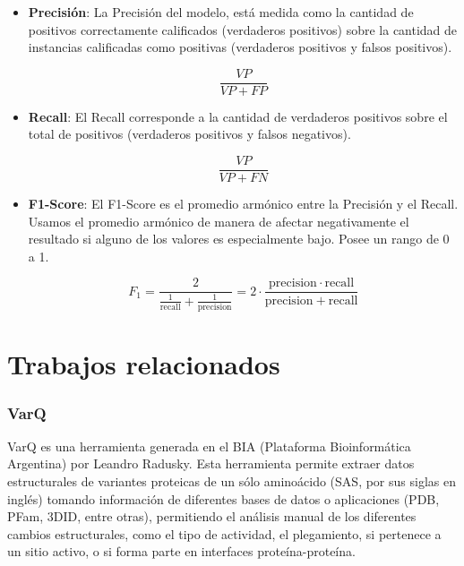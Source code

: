 \begin{itemize}
    \item \textbf{Precisión}: La Precisión del modelo, está medida como la cantidad de positivos correctamente calificados (verdaderos positivos) sobre la cantidad de instancias calificadas como positivas (verdaderos positivos y falsos positivos).
    
    \begin{equation*}
        \frac{VP}{VP + FP}
    \end{equation*}
    
    \item \textbf{Recall}: El Recall corresponde a la cantidad de verdaderos positivos sobre el total de positivos (verdaderos positivos y falsos negativos).
    
    \begin{equation*}
        \frac{VP}{VP + FN}
    \end{equation*}
    
    \item \textbf{F1-Score}: El F1-Score es el promedio armónico entre la Precisión y el Recall. Usamos el promedio armónico de manera de afectar negativamente el resultado si alguno de los valores es especialmente bajo. Posee un rango de 0 a 1. 
    
    \begin{equation*}
        F_1 = \frac{2}{\tfrac{1}{\mathrm{recall}} + \tfrac{1}{\mathrm{precision}}} = 2 \cdot \frac{\mathrm{precision} \cdot \mathrm{recall}}{\mathrm{precision} + \mathrm{recall}}
    \end{equation*}
    
\end{itemize}

\section{Trabajos relacionados}

\subsubsection{VarQ \cite{Radusky2017}}

VarQ es una herramienta generada en el BIA (Plataforma Bioinformática Argentina) por Leandro Radusky. Esta herramienta permite extraer datos estructurales de variantes proteicas de un sólo aminoácido (SAS, por sus siglas en inglés) tomando información de diferentes bases de datos o aplicaciones (PDB, PFam, 3DID, entre otras), permitiendo el análisis manual de los diferentes cambios estructurales, como el tipo de actividad, el plegamiento, si pertenece a un sitio activo, o si forma parte en interfaces proteína-proteína. 

